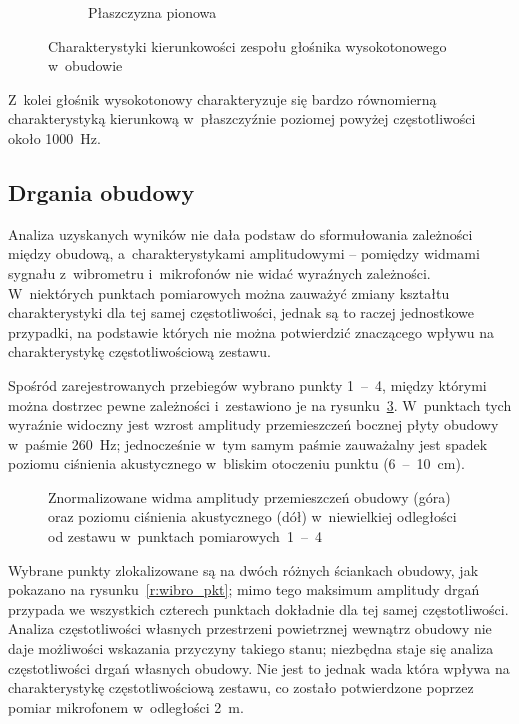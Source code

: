 \documentclass[12pt]{oska}
\newcommand{\range}[2]{\num{#1}~--~\num{#2}}
\begin{document}
\begin{figure}[!ht]
\begin{subfigure}[b]{.46\textwidth}
			\caption{Płaszczyzna pionowa}
			\label{r:H_pion}
		\end{subfigure}
		\caption{Charakterystyki kierunkowości zespołu głośnika wysokotonowego w~obudowie}
		\label{r:kierunkowosc_H}
	\end{figure}
	
	Z~kolei głośnik wysokotonowy charakteryzuje się bardzo równomierną charakterystyką kierunkową w~płaszczyźnie poziomej powyżej częstotliwości około \SI{1000}{Hz}.
	
	
	
	\subsection{Drgania obudowy}
	
	Analiza uzyskanych wyników nie dała podstaw do sformułowania zależności między obudową, a~charakterystykami amplitudowymi -- pomiędzy widmami sygnału z~wibrometru i~mikrofonów nie widać wyraźnych zależności. W~niektórych punktach pomiarowych można zauważyć zmiany kształtu charakterystyki dla tej samej częstotliwości, jednak są to raczej jednostkowe przypadki, na podstawie których nie można potwierdzić znaczącego wpływu na charakterystykę częstotliwościową zestawu.
	
	Spośród zarejestrowanych przebiegów wybrano punkty \range{1}{4}, między którymi można dostrzec pewne zależności i~zestawiono je na rysunku~\ref{r:wibrometr_1-4}. W~punktach tych wyraźnie widoczny jest wzrost amplitudy przemieszczeń bocznej płyty obudowy w~paśmie \SI{260}{\hertz}; jednocześnie w~tym samym paśmie zauważalny jest spadek poziomu ciśnienia akustycznego w~bliskim otoczeniu punktu (\range{6}{10}~\si{\cm}).
	
	\begin{figure}[!ht]
		\centering
		\caption{Znormalizowane widma amplitudy przemieszczeń obudowy (góra) oraz poziomu ciśnienia akustycznego (dół) w~niewielkiej odległości od zestawu w~punktach pomiarowych~\range{1}{4}}
		\label{r:wibrometr_1-4}
	\end{figure}
	
	Wybrane punkty zlokalizowane są na dwóch różnych ściankach obudowy, jak pokazano na rysunku~\ref{r:wibro_pkt}; mimo tego maksimum amplitudy drgań przypada we wszystkich czterech punktach dokładnie dla tej samej częstotliwości. Analiza częstotliwości własnych przestrzeni powietrznej wewnątrz obudowy nie daje możliwości wskazania przyczyny takiego stanu; niezbędna staje się analiza częstotliwości drgań własnych obudowy. Nie jest to jednak wada która wpływa na charakterystykę częstotliwościową zestawu, co zostało potwierdzone poprzez pomiar mikrofonem w~odległości \SI{2}{\metre}.
	
\end{document}
